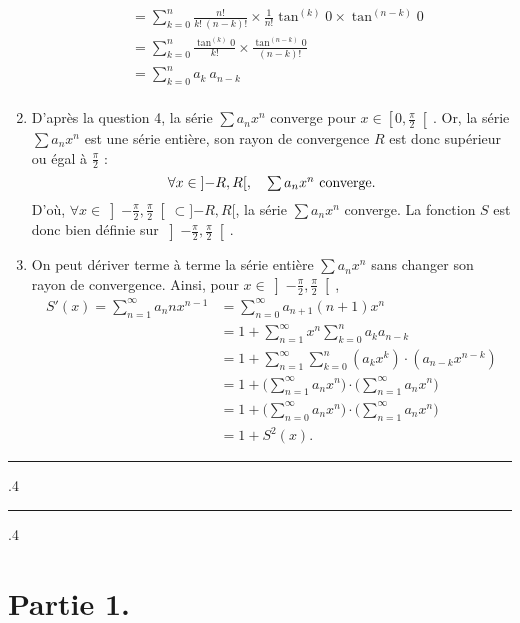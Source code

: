 \documentclass[a4paper]{article}
\makeatletter
\newcommand*\longline[1][.4\p@]{%
	\leavevmode
	\leaders \hrule \@height #1\relax \hfill
	\null
}
\makeatother
\begin{document}
\begin{enumerate}
\begin{align*}
				&= \sum_{k=0}^n \frac{n!}{k!\:(n-k)!} \times \frac{1}{n!} \tan^{(k)} 0 \times \tan^{(n-k)} 0  \\
				&= \sum_{k=0}^n \frac{\tan^{(k)} 0}{k!} \times \frac{\tan^{(n-k)} 0}{(n-k)!} \\
				&= \sum_{k=0}^n a_k\:a_{n-k} \\
			\end{align*}
		\item D'après la question 4, la série $\sum a_n x^n$\/ converge pour $x \in \left[0,\frac{\pi}{2}\right[$. Or, la série $\sum a_n x^n$\/ est une série entière, son rayon de convergence $R$ est donc supérieur ou égal à $\frac{\pi}{2}$ : \[
				\textstyle\forall x \in {]{-R},R[}, \quad \sum a_n x^n \text{ converge}
			.\] D'où, $\forall x \in \left] {-\frac{\pi}{2}}, \frac{\pi}{2} \right[ \subset {]{-R},R[}$, la série $\sum a_n x^n$ converge. La fonction $S$\/ est donc bien définie sur $\left] {-\frac{\pi}{2}}, \frac{\pi}{2} \right[$.
		\item On peut dériver terme à terme la série entière $\sum a_n x^n$\/ sans changer son rayon de convergence. Ainsi, pour $x \in \left]{-\frac{\pi}{2}}, \frac{\pi}{2}\right[$,
			\begin{align*}
				S'(x) = \sum_{n=1}^\infty a_n n x^{n-1} &= \sum_{n=0}^\infty a_{n+1}(n+1) x^n\\
				&= 1+ \sum_{n=1}^\infty x^n\sum_{k=0}^n a_k a_{n-k} \\
				&= 1+\sum_{n=1}^\infty \sum_{k=0}^n (a_k x^k) \cdot(a_{n-k} x^{n-k}) \\
				&= 1+\Big(\!\sum_{n=1}^\infty a_n x^n \Big) \cdot \Big(\!\sum_{n=1}^\infty a_n x^n\Big) \\
				&= 1+\Big(\!\sum_{n=0}^\infty a_n x^n \Big) \cdot \Big(\!\sum_{n=1}^\infty a_n x^n\Big) \\
				&= 1+S^2(x).
			\end{align*}
	\end{enumerate}

	\bigskip
	\bigskip
	\bigskip
	\bigskip

	{ \noindent
		\longline\quad
		\quad\longline
	}

	\section{Partie 1.}
\end{document}
